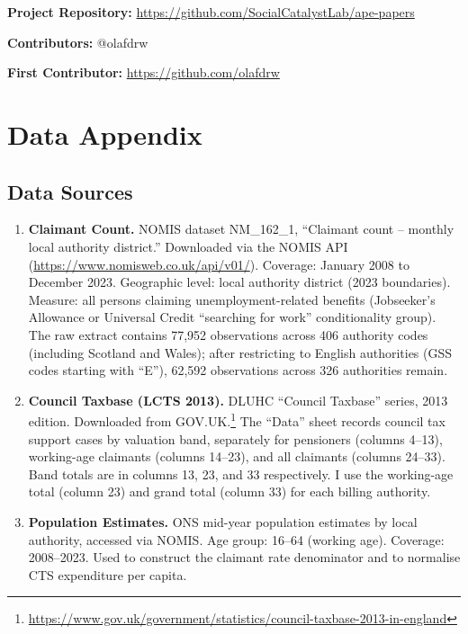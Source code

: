 \documentclass[12pt]{article}
\begin{document}
\noindent\textbf{Project Repository:} \url{https://github.com/SocialCatalystLab/ape-papers}

\noindent\textbf{Contributors:} @olafdrw

\noindent\textbf{First Contributor:} \url{https://github.com/olafdrw}

\label{apep_main_text_end}
\newpage



\newpage
\appendix

\section{Data Appendix}
\label{app:data}

\subsection{Data Sources}

\begin{enumerate}
\item \textbf{Claimant Count.} NOMIS dataset NM\_162\_1, ``Claimant count -- monthly local authority district.'' Downloaded via the NOMIS API (\url{https://www.nomisweb.co.uk/api/v01/}). Coverage: January 2008 to December 2023. Geographic level: local authority district (2023 boundaries). Measure: all persons claiming unemployment-related benefits (Jobseeker's Allowance or Universal Credit ``searching for work'' conditionality group). The raw extract contains 77,952 observations across 406 authority codes (including Scotland and Wales); after restricting to English authorities (GSS codes starting with ``E''), 62,592 observations across 326 authorities remain.

\item \textbf{Council Taxbase (LCTS 2013).} DLUHC ``Council Taxbase'' series, 2013 edition. Downloaded from GOV.UK.\footnote{\url{https://www.gov.uk/government/statistics/council-taxbase-2013-in-england}} The ``Data'' sheet records council tax support cases by valuation band, separately for pensioners (columns 4--13), working-age claimants (columns 14--23), and all claimants (columns 24--33). Band totals are in columns 13, 23, and 33 respectively. I use the working-age total (column 23) and grand total (column 33) for each billing authority.

\item \textbf{Population Estimates.} ONS mid-year population estimates by local authority, accessed via NOMIS. Age group: 16--64 (working age). Coverage: 2008--2023. Used to construct the claimant rate denominator and to normalise CTS expenditure per capita.
\end{enumerate}
\end{document}
